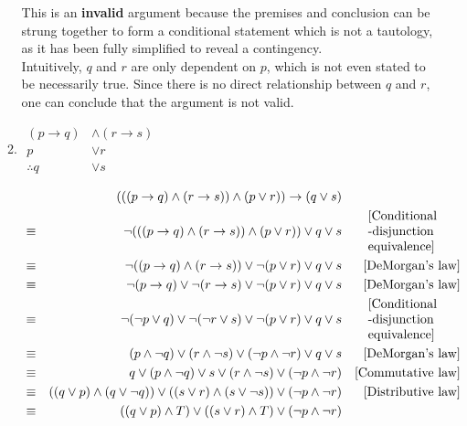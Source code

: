 \documentclass[letterpaper, 12pt]{article}
\newcommand{\then}{\rightarrow}
\begin{document}
\begin{enumerate}
\begin{enumerate}
\begin{flushleft}
    This is an \textbf{invalid} argument because the premises and conclusion can be strung 
    together to form a conditional statement which is not a tautology, as it has been fully 
    simplified to reveal a contingency. \\
    Intuitively, $q$ and $r$ are only dependent on $p$, which is not even stated to be 
    necessarily true. Since there is no direct relationship between $q$ and $r$, one can 
    conclude that the argument is not valid.
\end{flushleft}
\item \parbox{3in}{$\begin{aligned}
    (p \then q) &\wedge (r \then s) \\
    p &\vee r \\
    \hline
    \therefore q &\vee s
\end{aligned}$}
\begin{align*}
    &\quad & (((p \then q) \wedge (r \then s)) \wedge (p \vee r)) \then (q \vee s) & \\
    &\equiv & \neg(((p \then q) \wedge (r \then s)) \wedge (p \vee r)) \vee q \vee s & 
    &\parbox{1in}{[Conditional \\-disjunction \\ equivalence]} \\
    &\equiv & \neg((p \then q) \wedge (r \then s)) \vee \neg(p \vee r) \vee q \vee s & 
    &\text{[DeMorgan's law]} \\
    &\equiv & \neg(p \then q) \vee \neg(r \then s) \vee \neg(p \vee r) \vee q \vee s & 
    &\text{[DeMorgan's law]} \\
    &\equiv & \neg(\neg p \vee q) \vee \neg(\neg r \vee s) \vee \neg(p \vee r) \vee q \vee s & 
    &\parbox{1in}{[Conditional \\-disjunction \\ equivalence]} \\
    &\equiv & (p \wedge \neg q) \vee (r \wedge \neg s) \vee (\neg p \wedge \neg r) \vee q \vee s & 
    &\text{[DeMorgan's law]} \\
    &\equiv & q \vee (p \wedge \neg q) \vee s \vee (r \wedge \neg s) \vee (\neg p \wedge \neg r) & 
    &\text{[Commutative law]} \\
    &\equiv & ((q \vee p) \wedge (q \vee \neg q)) 
    \vee ((s \vee r) \wedge (s \vee \neg s)) 
    \vee (\neg p \wedge \neg r) & 
    &\text{[Distributive law]} \\
    &\equiv & ((q \vee p) \wedge T) 
    \vee ((s \vee r) \wedge T) 
    \vee (\neg p \wedge \neg r) & 

\end{align*}
\end{enumerate}
\end{enumerate}
\end{document}
